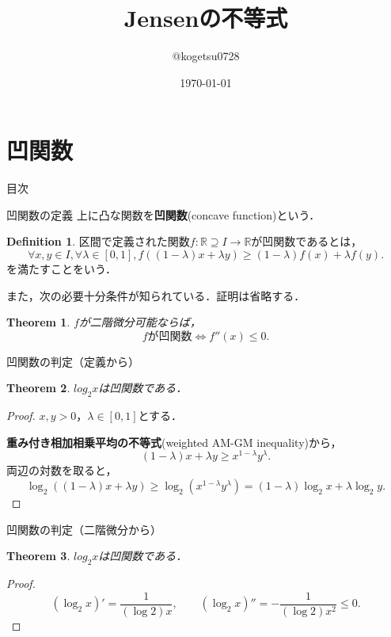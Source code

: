 \documentclass[dvipdfmx,aspectratio=169]{beamer}
\title{
    Jensenの不等式
}
\author{@kogetsu0728}
\date{\today}
\theoremstyle{plain}
\newtheorem{thm}{Theorem}
\theoremstyle{definition}
\newtheorem{dfn}{Definition}
\begin{document}
\maketitle

\section{凹関数}
\begin{frame}{目次}
	\tableofcontents[currentsection]
\end{frame}

\begin{frame}{凹関数の定義}
	上に凸な関数を\textbf{凹関数}(concave function)という\cite{lit:proof}．
	\begin{dfn}
		区間で定義された関数$f:\mathbb{R} \supseteq I \to \mathbb{R}$が凹関数であるとは，
		\[
			\forall x,y \in I, \forall \lambda \in [0,1], f((1-\lambda)x + \lambda y) \ge (1-\lambda)f(x) + \lambda f(y).
		\]
		を満たすことをいう．
	\end{dfn}

	また，次の必要十分条件が知られている．証明は省略する．
	\begin{thm}
		$f$が二階微分可能ならば，
		\[
			\text{$f$が凹関数} \iff f''(x) \le 0.
		\]
	\end{thm}
\end{frame}

\begin{frame}{凹関数の判定（定義から）}
	\begin{thm}
		$log_2 x$は凹関数である．
	\end{thm}

	\begin{proof}
		$x,y > 0$，$\lambda \in [0, 1]$とする．

		\textbf{重み付き相加相乗平均の不等式}(weighted AM-GM inequality)から，
		\[
			(1-\lambda)x + \lambda y \ge x^{1-\lambda} y^\lambda.
		\]
		両辺の対数を取ると，
		\[
			\log_2 ((1-\lambda)x + \lambda y) \ge \log_2 (x^{1-\lambda} y^\lambda) = (1-\lambda)\log_2 x + \lambda \log_2 y.
		\]
	\end{proof}
\end{frame}

\begin{frame}{凹関数の判定（二階微分から）}
	\begin{thm}
		$log_2 x$は凹関数である．
	\end{thm}

	\begin{proof}
		\[
			(\log_2 x)' = \frac{1}{(\log 2)x}, \qquad
			(\log_2 x)'' = -\frac{1}{(\log 2)x^2} \le 0.
		\]
	\end{proof}
\end{frame}
\end{document}
